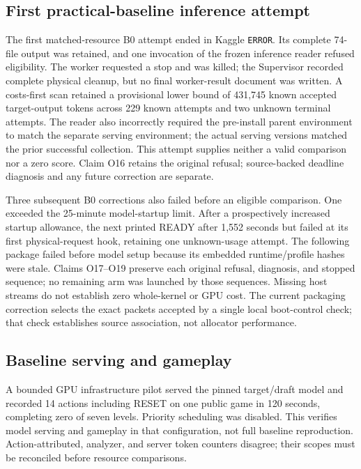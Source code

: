 \documentclass[11pt]{article}
\begin{document}
\subsection{First practical-baseline inference attempt}
The first matched-resource B0 attempt ended in Kaggle \texttt{ERROR}. Its complete 74-file output was retained, and one invocation of the frozen inference reader refused eligibility. The worker requested a stop and was killed; the Supervisor recorded complete physical cleanup, but no final worker-result document was written. A costs-first scan retained a provisional lower bound of 431,745 known accepted target-output tokens across 229 known attempts and two unknown terminal attempts. The reader also incorrectly required the pre-install parent environment to match the separate serving environment; the actual serving versions matched the prior successful collection. This attempt supplies neither a valid comparison nor a zero score. Claim O16 retains the original refusal; source-backed deadline diagnosis and any future correction are separate.

Three subsequent B0 corrections also failed before an eligible comparison. One exceeded the 25-minute model-startup limit. After a prospectively increased startup allowance, the next printed READY after 1,552 seconds but failed at its first physical-request hook, retaining one unknown-usage attempt. The following package failed before model setup because its embedded runtime/profile hashes were stale. Claims O17--O19 preserve each original refusal, diagnosis, and stopped sequence; no remaining arm was launched by those sequences. Missing host streams do not establish zero whole-kernel or GPU cost. The current packaging correction selects the exact packets accepted by a single local boot-control check; that check establishes source association, not allocator performance.

\subsection{Baseline serving and gameplay}
A bounded GPU infrastructure pilot served the pinned target/draft model and recorded 14 actions including RESET on one public game in 120 seconds, completing zero of seven levels. Priority scheduling was disabled. This verifies model serving and gameplay in that configuration, not full baseline reproduction. Action-attributed, analyzer, and server token counters disagree; their scopes must be reconciled before resource comparisons.
\end{document}
